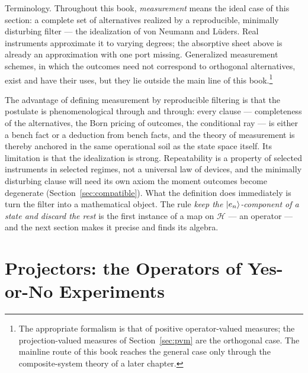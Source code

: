 \begin{note}
    Terminology. Throughout this book, \emph{measurement} means the ideal case of this section: a complete set of alternatives realized by a reproducible, minimally disturbing filter --- the idealization of von Neumann and L\"uders. Real instruments approximate it to varying degrees; the absorptive sheet above is already an approximation with one port missing. Generalized measurement schemes, in which the outcomes need not correspond to orthogonal alternatives, exist and have their uses, but they lie outside the main line of this book.\footnote{The appropriate formalism is that of positive operator-valued measures; the projection-valued measures of Section~\ref{sec:pvm} are the orthogonal case. The mainline route of this book reaches the general case only through the composite-system theory of a later chapter.}
\end{note}

The advantage of defining measurement by reproducible filtering is that the postulate is phenomenological through and through: every clause --- completeness of the alternatives, the Born pricing of outcomes, the conditional ray --- is either a bench fact or a deduction from bench facts, and the theory of measurement is thereby anchored in the same operational soil as the state space itself. Its limitation is that the idealization is strong. Repeatability is a property of selected instruments in selected regimes, not a universal law of devices, and the minimally disturbing clause will need its own axiom the moment outcomes become degenerate (Section~\ref{sec:compatible}). What the definition does immediately is turn the filter into a mathematical object. The rule \emph{keep the $\ket{e_n}$-component of a state and discard the rest} is the first instance of a map on $\mathcal{H}$ --- an operator --- and the next section makes it precise and finds its algebra.

\section{Projectors: the Operators of Yes-or-No Experiments}
\label{sec:projectors}

